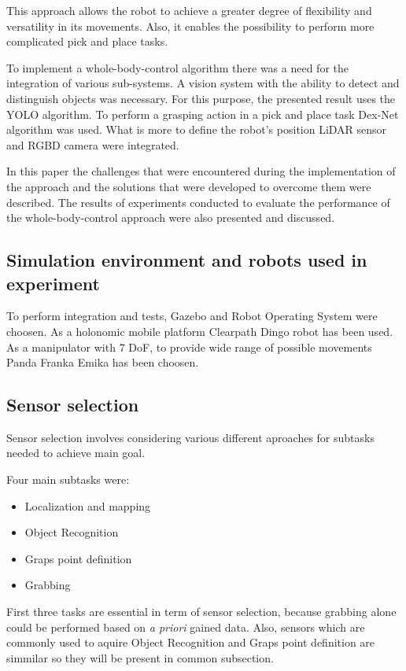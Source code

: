\documentclass[conference,a4paper]{IEEEtran}
\begin{document}
This approach allows the robot to achieve a greater degree of flexibility and versatility in its movements. Also, it enables the possibility to perform more complicated pick and place tasks.

To implement a whole-body-control algorithm there was a need for the integration of various sub-systems. A vision system with the ability to detect and distinguish objects was necessary. For this purpose, the presented result uses the YOLO algorithm. To perform a grasping action in a pick and place task Dex-Net algorithm was used. What is more to define the robot's position LiDAR sensor and RGBD camera were integrated. 

In this paper the challenges that were encountered during the implementation of the approach and the solutions that were developed to overcome them were described. 
The results of experiments conducted to evaluate the performance of the whole-body-control approach were also presented and discussed.

\subsection{Simulation environment and robots used in experiment} 
To perform integration and tests, Gazebo and Robot Operating System were choosen. As a holonomic mobile platform Clearpath Dingo robot has been used. As a manipulator with 7 DoF,  to provide wide range of possible movements Panda Franka Emika has been choosen.

\subsection{Sensor selection}
Sensor selection involves considering various different aproaches for subtasks needed to achieve main goal.

Four main subtasks were:
\begin{itemize}
  \item Localization and mapping
  \item Object Recognition
  \item Graps point definition
  \item Grabbing
\end{itemize}

First three tasks are essential in term of sensor selection, because grabbing alone could be performed based on \textit{a priori} gained data. Also, sensors which are commonly used to aquire Object Recognition and Graps point definition are simmilar so they will be present in common subsection.
\end{document}
